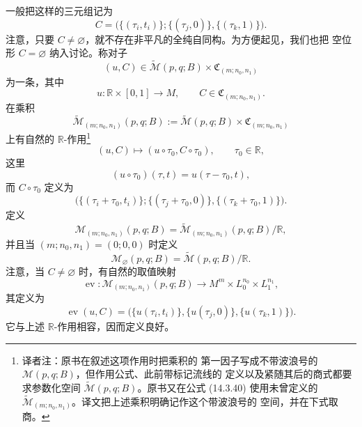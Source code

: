 一般把这样的三元组记为
\[
  C
  =
  \bigl(
    \{(\tau_i,t_i)\};
    \{(\tau_j,0)\},
    \{(\tau_k,1)\}
  \bigr).
\]
注意，只要 $C\neq\varnothing$，就不存在非平凡的全纯自同构。为方便起见，我们也把
空位形 $C=\varnothing$ 纳入讨论。称对子
\[
  (u,C)
  \in
  \widetilde{\mathcal M}(p,q;B)
  \times
  \mathfrak C_{(m;n_0,n_1)}
\]
为一条\termMarkedFloerTrajectory{}，其中
\[
  u:\mathbb R\times[0,1]\longrightarrow M,
  \qquad
  C\in\mathfrak C_{(m;n_0,n_1)}.
\]
在乘积
\[
  \widetilde{\mathcal M}_{(m;n_0,n_1)}(p,q;B)
  :=
  \widetilde{\mathcal M}(p,q;B)
  \times
  \mathfrak C_{(m;n_0,n_1)}
\]
上有自然的 $\mathbb R$-作用\footnote{译者注：原书在叙述这项作用时把乘积的
第一因子写成不带波浪号的 $\mathcal M(p,q;B)$，但作用公式、此前带标记流线的
定义以及紧随其后的商式都要求参数化空间
$\widetilde{\mathcal M}(p,q;B)$。原书又在公式 (14.3.40) 使用未曾定义的
$\widetilde{\mathcal M}_{(m;n_0,n_1)}$。译文把上述乘积明确记作这个带波浪号的
空间，并在下式取商。}
\[
  (u,C)\longmapsto(u\circ\tau_0,C\circ\tau_0),
  \qquad \tau_0\in\mathbb R,
\]
这里
\[
  (u\circ\tau_0)(\tau,t)=u(\tau-\tau_0,t),
\]
而 $C\circ\tau_0$ 定义为
\[
  \bigl(
    \{(\tau_i+\tau_0,t_i)\};
    \{(\tau_j+\tau_0,0)\},
    \{(\tau_k+\tau_0,1)\}
  \bigr).
\]
定义
\[
  \mathcal M_{(m;n_0,n_1)}(p,q;B)
  =
  \widetilde{\mathcal M}_{(m;n_0,n_1)}(p,q;B)/\mathbb R,
\]
并且当 $(m;n_0,n_1)=(0;0,0)$ 时定义
\[
  \mathcal M_\varnothing(p,q;B)
  =
  \widetilde{\mathcal M}(p,q;B)/\mathbb R.
\]
注意，当 $C\neq\varnothing$ 时，有自然的取值映射
\[
  \operatorname{ev}:
  \mathcal M_{(m;n_0,n_1)}(p,q;B)
  \longrightarrow
  M^m\times L_0^{n_0}\times L_1^{n_1},
\]
其定义为
\[
  \operatorname{ev}(u,C)
  =
  \bigl(
    \{u(\tau_i,t_i)\},
    \{u(\tau_j,0)\},
    \{u(\tau_k,1)\}
  \bigr).
\]
它与上述 $\mathbb R$-作用相容，因而定义良好。

